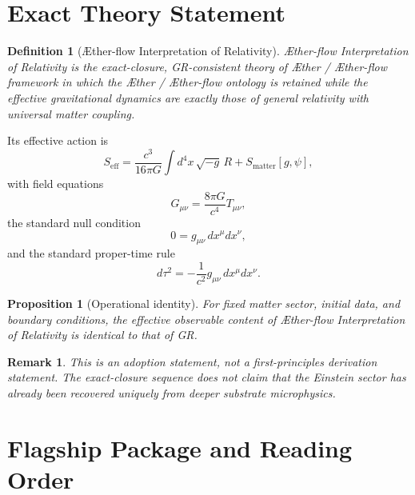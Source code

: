 \documentclass[11pt]{article}
\newcommand{\Aether}{\AE{}ther}
\newcommand{\Aflow}{\AE{}ther-flow}
\newcommand{\TheoryName}{\Aflow{} Interpretation of Relativity}
\newcommand{\TheoryProgram}{\Aether{} / \Aflow{} framework}
\newtheorem{definition}{Definition}
\newtheorem{proposition}{Proposition}
\newtheorem{remark}{Remark}
\begin{document}
\section{Exact Theory Statement}

\begin{definition}[\TheoryName{}]
\TheoryName{} is the exact-closure, GR-consistent theory of \TheoryProgram{} in which the \Aether{} / \Aflow{} ontology is retained while the effective gravitational dynamics are exactly those of general relativity with universal matter coupling.
\end{definition}

Its effective action is
\begin{equation}
S_{\mathrm{eff}}
=
\frac{c^3}{16\pi G}\int d^4x\,\sqrt{-g}\,R
+
S_{\mathrm{matter}}[g,\psi],
\label{eq:SA}
\end{equation}
with field equations
\begin{equation}
G_{\mu\nu}
=
\frac{8\pi G}{c^4}T_{\mu\nu},
\label{eq:einstein}
\end{equation}
the standard null condition
\begin{equation}
0=g_{\mu\nu}\,dx^\mu dx^\nu,
\label{eq:null}
\end{equation}
and the standard proper-time rule
\begin{equation}
d\tau^2=-\frac{1}{c^2}g_{\mu\nu}\,dx^\mu dx^\nu.
\label{eq:propertime}
\end{equation}

\begin{proposition}[Operational identity]
For fixed matter sector, initial data, and boundary conditions, the effective observable content of \TheoryName{} is identical to that of GR.
\end{proposition}

\begin{remark}
This is an adoption statement, not a first-principles derivation statement. The exact-closure sequence does not claim that the Einstein sector has already been recovered uniquely from deeper substrate microphysics.
\end{remark}

\section{Flagship Package and Reading Order}
\end{document}
